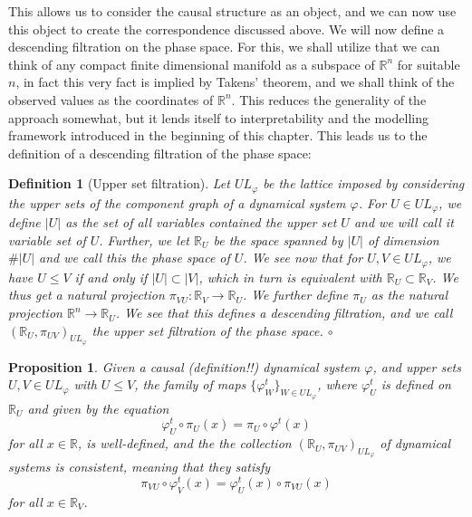 \documentclass[11pt, a4paper]{memoir}
\theoremstyle{break}
\newtheorem{prop}{Proposition}
\theoremstyle{break}
\newtheorem{innerdefn}{Definition}
\newenvironment{defn}
  {\begin{innerdefn}}
  {\ensuremath{\circ}\end{innerdefn}}
\theoremstyle{nonumberplain}
\newcommand{\mR}{\mathbb{R}}
\begin{document}
This allows us to consider the causal structure as an object, and we can now use this object to create the correspondence discussed above. We will now define a descending filtration on the phase space. For this, we shall utilize that we can think of any compact finite dimensional manifold as a subspace of $\mR^n$ for suitable $n$, in fact this very fact is implied by Takens' theorem, and we shall think of the observed values as the coordinates of $\mR^n$. This reduces the generality of the approach somewhat, but it lends itself to interpretability and the modelling framework introduced in the beginning of this chapter. This leads us to the definition of a descending filtration of the phase space:
\begin{defn}[Upper set filtration]
Let $UL_\varphi$ be the lattice imposed by considering the upper sets of the component graph of a dynamical system $\varphi$. For $U\in UL_\varphi$, we define $|U|$ as the set of all variables contained the upper set $U$ and we will call it \textit{variable set} of $U$. Further, we let $\mR_U$ be the space spanned by $|U|$ of dimension $\#|U|$ and we call this the \textit{phase space} of $U$. We see now that for $U,V\in UL_\varphi$, we have $U\leqslant V$ if and only if $|U|\subset |V|$, which in turn is equivalent with $\mR_U\subset \mR_V$. We thus get a natural projection $\pi_{VU}:\mR_V\to\mR_U$. We further define $\pi_U$ as the natural projection $\mR^n\to \mR_U$. We see that this defines a descending filtration, and we call $(\mR_U,\pi_{UV})_{UL_\varphi}$ the \emph{upper set filtration of the phase space}.
\end{defn} 
\begin{prop}
Given a causal (\textit{definition!!}) dynamical system $\varphi$, and upper sets $U,V\in UL_\varphi$ with $U\leqslant V$, the family of maps $\{\varphi^t_W\}_{W\in UL_\varphi}$, where $\varphi_U^t$ is defined on $\mR_U$ and given by the equation
$$\varphi^t_U\circ\pi_U(x)=\pi_U\circ \varphi^t(x)$$
for all $x\in \mR$, is well-defined, and the the collection $(\mR_U,\pi_{UV})_{UL_\varphi}$ of dynamical systems is consistent, meaning that they satisfy
$$\pi_{VU}\circ \varphi_V^t(x)=\varphi_U^t(x)\circ\pi_{VU}(x)$$
for all $x\in \mR_V$.
\end{prop}
\end{document}
